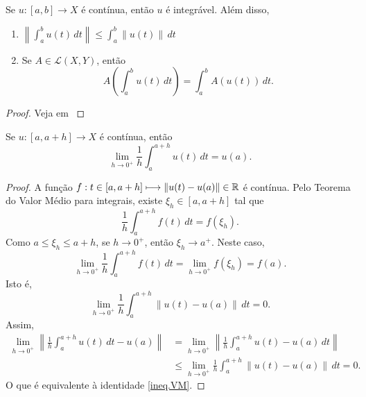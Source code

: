 \begin{proposition}\label{KthA3.2}
Se $u:[a,b]\longrightarrow X$ é {contínua}, então $u$ é integrável. Além disso, 
\begin{enumerate}
    \item $\displaystyle\left\|\int_a^b u(t)\,dt\right\|\leq \int_a^b \|u(t)\|\,dt$
    \item Se $A\in \mathcal{L}(X,Y)$, então
    \[ A\left(\int_a^b u(t)\,dt\right)=\int_a^b A(u(t))\,dt. \]
\end{enumerate}
\end{proposition}
\begin{proof}
Veja em \cite[Theorem A3.2]{kesavan2015topics}
\end{proof}

\begin{proposition}
Se $u:[a,a+h]\longrightarrow X$ é {contínua}, então
\begin{equation}\label{ineq.VM}
\lim\limits_{h\to 0^+} \frac{1}{h}\int_a^{a+h} u(t)\,dt = u(a).
\end{equation}
\end{proposition}
\begin{proof}
A função  $f:t\in [a,a+h]\longmapsto \|u(t)-u(a)\|\in \mathbb{R}$ é contínua. Pelo Teorema do Valor Médio para integrais, existe $\xi_h\in [a,a+h]$ tal que 
\[
\frac{1}{h}\int_a^{a+h} f(t)\,dt=f(\xi_h).
\]
Como $a\leq \xi_h\leq a+h$, se $h\to 0^+$, então $\xi_h\to a^+$. Neste caso, 
\[
\lim_{h\to 0^+}\frac{1}{h}\int_a^{a+h} f(t)\,dt=\lim_{h\to 0^+}f(\xi_h)=f(a).
\]
Isto é, 
\begin{equation*}
\lim_{h\to 0^+}\frac{1}{h}\int_a^{a+h} \|u(t)-u(a)\|\,dt=0.
\end{equation*}
Assim, 
\begin{align*}
\lim_{h\to 0^+}\left\|\frac{1}{h}\int_a^{a+h} u(t)\,dt -u(a)\right\|& =
\lim_{h\to 0^+}\left\|\frac{1}{h}\int_a^{a+h} u(t)-u(a)\,dt\right\|\\
&\leq \lim_{h\to 0^+}\frac{1}{h}\int_a^{a+h}\left\| u(t)-u(a)\right\|\,dt
=0.
\end{align*}
O que é equivalente à identidade \eqref{ineq.VM}.
\end{proof}